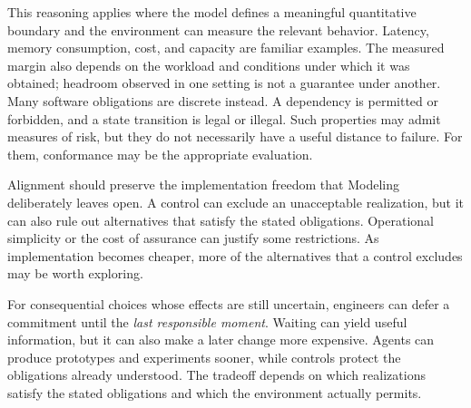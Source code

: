 This reasoning applies where the model defines a meaningful quantitative boundary and the environment can measure the relevant behavior. Latency, memory consumption, cost, and capacity are familiar examples. The measured margin also depends on the workload and conditions under which it was obtained; headroom observed in one setting is not a guarantee under another. Many software obligations are discrete instead. A dependency is permitted or forbidden, and a state transition is legal or illegal. Such properties may admit measures of risk, but they do not necessarily have a useful distance to failure. For them, conformance may be the appropriate evaluation.



Alignment should preserve the implementation freedom that Modeling deliberately leaves open. A control can exclude an unacceptable realization, but it can also rule out alternatives that satisfy the stated obligations. Operational simplicity or the cost of assurance can justify some restrictions. As implementation becomes cheaper, more of the alternatives that a control excludes may be worth exploring.


For consequential choices whose effects are still uncertain, engineers can defer a commitment until the \emph{last responsible moment}. Waiting can yield useful information, but it can also make a later change more expensive. Agents can produce prototypes and experiments sooner, while controls protect the obligations already understood. The tradeoff depends on which realizations satisfy the stated obligations and which the environment actually permits.


